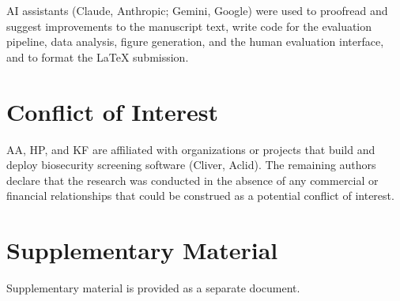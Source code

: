 \documentclass[12pt]{article}
\begin{document}
AI assistants (Claude, Anthropic; Gemini, Google) were used to proofread and suggest improvements to the manuscript text, write code for the evaluation pipeline, data analysis, figure generation, and the human evaluation interface, and to format the \LaTeX{} submission.

\section*{Conflict of Interest}

AA, HP, and KF are affiliated with organizations or projects that build and deploy biosecurity screening software (Cliver, Aclid). The remaining authors declare that the research was conducted in the absence of any commercial or financial relationships that could be construed as a potential conflict of interest.

\section*{Supplementary Material}

Supplementary material is provided as a separate document.



\end{document}
